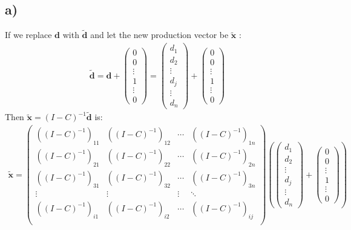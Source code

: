 \documentclass[11pt]{article}
\begin{document}
\subsection{a)}
If we replace $\textbf{d}$ with $\bm{\tilde{d}}$ and let the new production vector be $\bm{\tilde{x}}$ :
\begin{align*}
\bm{\tilde{d}} = \textbf{d}+
\left(\begin{array}{c}
0 \\
0 \\
\vdots \\
1 \\ 
\vdots \\
0
\end{array}\right)
= 
\left(\begin{array}{c}
d_1\\
d_2\\
\vdots \\
d_j \\ 
\vdots \\
d_n
\end{array}\right)
+
\left(\begin{array}{c}
0 \\
0 \\
\vdots \\
1 \\ 
\vdots \\
0
\end{array}\right)
\end{align*}
Then $\bm{\tilde{x}}=(I-C)^{-1}\bm{\tilde{d}}$ is:
\begin{align}
\bm{\tilde{x}}=\left(\begin{array}{cccccc|c}
     ((I-C)^{-1})_{11}  &   ((I-C)^{-1})_{12}  &      \cdots  &  ((I-C)^{-1})_{1n}  \\
     ((I-C)^{-1})_{21}  &   ((I-C)^{-1})_{22}  &      \cdots  &  ((I-C)^{-1})_{2n}  \\
     ((I-C)^{-1})_{31}  &   ((I-C)^{-1})_{32}  &     \cdots  &  ((I-C)^{-1})_{3n}  \\ 
     \vdots          &   \vdots  &   \vdots   &   \ddots  \\
     ((I-C)^{-1})_{i1}  &  ((I-C)^{-1})_{i2}  &     \cdots  &   ((I-C)^{-1})_{ij}  \\ 
\end{array}\right)
\left(
\left(\begin{array}{c}
d_1\\
d_2\\
\vdots \\
d_j \\ 
\vdots \\
d_n
\end{array}\right)
+
\left(\begin{array}{c}
0 \\
0 \\
\vdots \\
1 \\ 
\vdots \\0
\end{array}\right)
\right)
\end{align}
\end{document}
